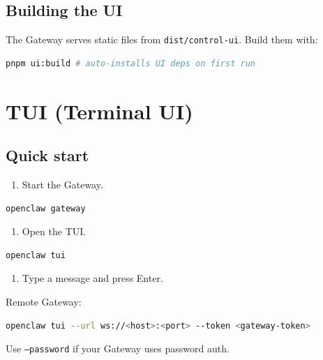 \subsection{Building the UI}


The Gateway serves static files from \texttt{dist/control-ui}. Build them with:

\begin{lstlisting}[language=bash]
pnpm ui:build # auto-installs UI deps on first run
\end{lstlisting}



\clearpage

\section{TUI (Terminal UI)}


\subsection{Quick start}


\begin{enumerate}
  \item Start the Gateway.
\end{enumerate}


\begin{lstlisting}[language=bash]
openclaw gateway
\end{lstlisting}


\begin{enumerate}
  \item Open the TUI.
\end{enumerate}


\begin{lstlisting}[language=bash]
openclaw tui
\end{lstlisting}


\begin{enumerate}
  \item Type a message and press Enter.
\end{enumerate}


Remote Gateway:

\begin{lstlisting}[language=bash]
openclaw tui --url ws://<host>:<port> --token <gateway-token>
\end{lstlisting}


Use \texttt{--password} if your Gateway uses password auth.

